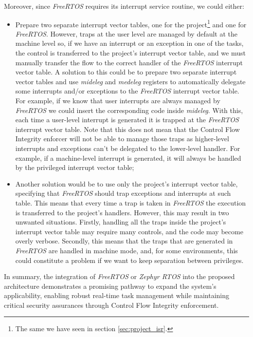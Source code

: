 Moreover, since \textit{FreeRTOS} requires its interrupt service routine, we
could either:
\begin{itemize}
  \item Prepare two separate interrupt vector tables, one for the project\footnote{The
    same we have seen in section \ref{sec:project_isr}.} and one for \textit{FreeRTOS}.
    However, traps at the user level are managed by default at the machine level
    so, if we have an interrupt or an exception in one of the tasks, the control
    is transferred to the project's interrupt vector table, and we must manually
    transfer the flow to the correct handler of the \textit{FreeRTOS} interrupt
    vector table. A solution to this could be to prepare two separate interrupt vector
    tables and use \textit{mideleg} and \textit{medeleg} registers to automatically
    delegate some interrupts and/or exceptions to the \textit{FreeRTOS}
    interrupt vector table. For example, if we know that user interrupts are
    always managed by \textit{FreeRTOS} we could insert the corresponding code inside
    \textit{mideleg}. With this, each time a user-level interrupt is generated
    it is trapped at the \textit{FreeRTOS} interrupt vector table. Note that
    this does not mean that the Control Flow Integrity enforcer will not be able
    to manage those traps as higher-level interrupts and exceptions can't be
    delegated to the lower-level handler. For example, if a machine-level
    interrupt is generated, it will always be handled by the privileged interrupt
    vector table;

  \item Another solution would be to use only the project's interrupt vector table,
    specifying that \textit{FreeRTOS} should trap exceptions and interrupts at such
    table. This means that every time a trap is taken in \textit{FreeRTOS} the execution
    is transferred to the project's handlers. However, this may result in two unwanted
    situations. Firstly, handling all the traps inside the project's interrupt vector
    table may require many controls, and the code may become overly verbose. Secondly,
    this means that the traps that are generated in \textit{FreeRTOS} are handled
    in machine mode, and, for some environments, this could constitute a problem
    if we want to keep separation between privileges.
\end{itemize}

In summary, the integration of \textit{FreeRTOS} or \textit{Zephyr RTOS} into the
proposed architecture demonstrates a promising pathway to expand the system's applicability,
enabling robust real-time task management while maintaining critical security
assurances through Control Flow Integrity enforcement.

